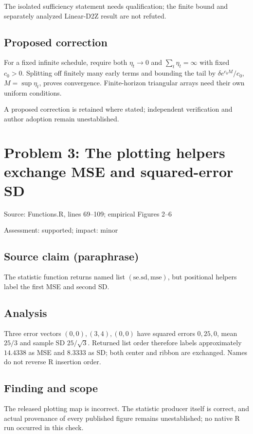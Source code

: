 \documentclass[11pt]{article}
\begin{document}
The isolated sufficiency statement needs qualification; the finite bound and separately analyzed Linear-D2Z result are not refuted.

\subsection*{Proposed correction}

For a fixed infinite schedule, require both \(\eta_t\to0\) and \(\sum_t\eta_t=\infty\) with fixed \(c_0>0\). Splitting off finitely many early terms and bounding the tail by \( \delta e^{c_0M}/c_0\), \(M=\sup\eta_t\), proves convergence. Finite-horizon triangular arrays need their own uniform conditions.

A proposed correction is retained where stated; independent verification and author adoption remain unestablished.

\section*{Problem 3: The plotting helpers exchange MSE and squared-error SD}

Source: Functions.R, lines 69–109; empirical Figures 2–6

Assessment: supported; impact: minor

\subsection*{Source claim (paraphrase)}

The statistic function returns named list \((\mathrm{se.sd},\mathrm{mse})\), but positional helpers label the first MSE and second SD.

\subsection*{Analysis}

Three error vectors \((0,0),(3,4),(0,0)\) have squared errors \(0,25,0\), mean \(25/3\) and sample SD \(25/\sqrt3\). Returned list order therefore labels approximately \(14.4338\) as MSE and \(8.3333\) as SD; both center and ribbon are exchanged. Names do not reverse R insertion order.

\subsection*{Finding and scope}

The released plotting map is incorrect. The statistic producer itself is correct, and actual provenance of every published figure remains unestablished; no native R run occurred in this check.
\end{document}

